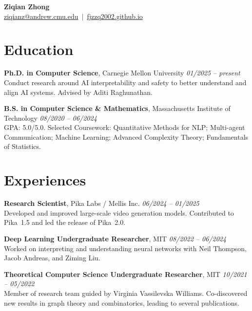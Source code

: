 \documentclass[11pt,letterpaper]{article}
\makeatletter
\newcommand{\daterange}[3][]{%
  \hfill \textit{#2 -- #3} \vspace{1mm}
}
\newcommand{\myname}{{\LARGE \textbf{Ziqian Zhong}}}
\newcommand{\email}{\href{mailto:ziqianz@andrew.cmu.edu}{ziqianz@andrew.cmu.edu}}
\newcommand{\github}{\href{https://fjzzq2002.github.io}{fjzzq2002.github.io}}
\makeatother
\begin{document}
\myname\\[2pt]
{\large \email\ $\mid$\ \github}

\section*{Education}
\textbf{Ph.D. in Computer Science}, Carnegie Mellon University \daterange[Pittsburgh,~PA]{01/2025}{present}\\
Conduct research around AI interpretability and safety to better understand and align AI systems. Advised by Aditi Raghunathan.

\vspace{4pt}
\textbf{B.S. in Computer Science \& Mathematics}, Massachusetts Institute of Technology \daterange[Cambridge,~MA]{08/2020}{06/2024}\\
GPA: 5.0/5.0. Selected Coursework: Quantitative Methods for NLP; Multi-agent Communication; Machine Learning; Advanced Complexity Theory; Fundamentals of Statistics.

\section*{Experiences}

\textbf{Research Scientist}, Pika Labs / Mellis Inc. \daterange[Palo Alto,~CA]{06/2024}{01/2025}\\
Developed and improved large-scale video generation models. Contributed to Pika~1.5 and led the release of Pika~2.0.

\vspace{4pt}
\textbf{Deep Learning Undergraduate Researcher}, MIT \daterange[Cambridge,~MA]{08/2022}{06/2024}\\
Worked on interpreting and understanding neural networks with Neil Thompson, Jacob Andreas, and Ziming Liu.

\vspace{4pt}
\textbf{Theoretical Computer Science Undergraduate Researcher}, MIT \daterange[Cambridge,~MA]{10/2021}{05/2022}\\
Member of research team guided by Virginia Vassilevska Williams. Co-discovered new results in graph theory and combinatorics, leading to several publications.

\end{document}
